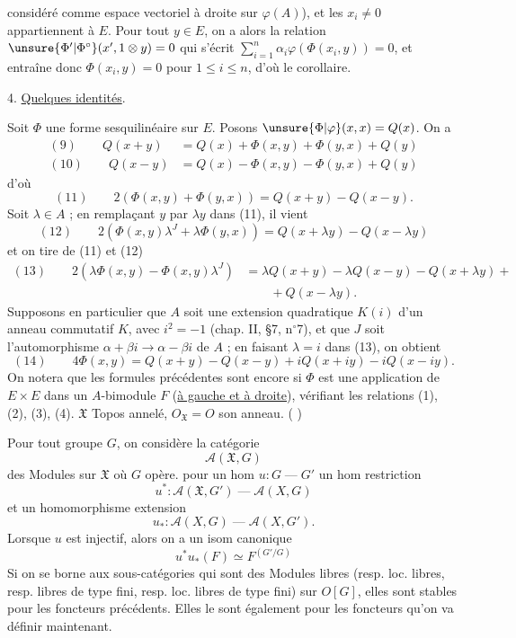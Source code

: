 considéré comme espace vectoriel à droite sur $\varphi(A)$), et les $x_i\ne0$ appartiennent à $E$. Pour tout $y\in E$, on a alors la relation $\unsure{\Phi'|\Phi^\circ}(x',1\otimes y)=0$ qui s'écrit $\sum_{i=1}^n\alpha_i\varphi(\Phi(x_i,y))=0$, et entraîne donc $\Phi(x_i,y)=0$ pour $1\le i\le n$, d'où le corollaire.

4. \uline{Quelques identités}.

Soit $\Phi$ une forme sesquilinéaire sur $E$. Posons $\unsure{\Phi|\varphi}(x,x)=Q(x)$. On a
\[
\begin{aligned}
(9)\qquad Q(x+y)&=Q(x)+\Phi(x,y)+\Phi(y,x)+Q(y)\\
(10)\qquad Q(x-y)&=Q(x)-\Phi(x,y)-\Phi(y,x)+Q(y)
\end{aligned}
\]
d'où
\[
(11)\qquad 2(\Phi(x,y)+\Phi(y,x))=Q(x+y)-Q(x-y).
\]
Soit $\lambda\in A$ ; en remplaçant $y$ par $\lambda y$ dans (11), il vient
\[
(12)\qquad 2(\Phi(x,y)\lambda^J+\lambda\Phi(y,x))=Q(x+\lambda y)-Q(x-\lambda y)
\]
et on tire de (11) et (12)
\[
\begin{aligned}
(13)\qquad 2(\lambda\Phi(x,y)-\Phi(x,y)\lambda^J)
&=\lambda Q(x+y)-\lambda Q(x-y)-Q(x+\lambda y)+{}\\
&\qquad{}+Q(x-\lambda y).
\end{aligned}
\]
Supposons en particulier que $A$ soit une extension quadratique $K(i)$ d'un anneau commutatif $K$, avec $i^2=-1$ (chap. II, \S 7, n$^\circ$7), et que $J$ soit l'automorphisme $\alpha+\beta i\longrightarrow\alpha-\beta i$ de $A$ ; en faisant $\lambda=i$ dans (13), on obtient
\[
(14)\qquad 4\Phi(x,y)=Q(x+y)-Q(x-y)+iQ(x+iy)-iQ(x-iy).
\]
On notera que les formules précédentes sont encore  si $\Phi$ est une application de $E\times E$ dans un $A$-bimodule $F$ (\uline{à gauche et à droite}), vérifiant les relations (1), (2), (3), (4).
 $\mathfrak X$ Topos annelé, $O_{\mathfrak X}=O$ son anneau. ( )

Pour tout groupe $G$, on considère la catégorie
\[
\mathcal A(\mathfrak X,G)
\]
des Modules sur $\mathfrak X$ où $G$ opère.  pour un hom $u:G\mathrel{\text{---}}G'$ un hom restriction
\[
u^*:\mathcal A(\mathfrak X,G')\mathrel{\text{---}}\mathcal A(X,G)
\]
et un homomorphisme extension
\[
u_*:\mathcal A(X,G)\mathrel{\text{---}}\mathcal A(X,G').
\]
Lorsque $u$ est injectif, alors on a  un isom   canonique
\[
u^*u_*(F)\simeq F^{(G'/G)}
\]
Si on se borne aux sous-catégories qui sont  des Modules libres (resp. loc. libres, resp. libres de type fini, resp. loc. libres de type fini) sur $O[G]$, elles sont stables pour les foncteurs précédents. Elles le sont également pour les foncteurs qu'on va définir maintenant.

